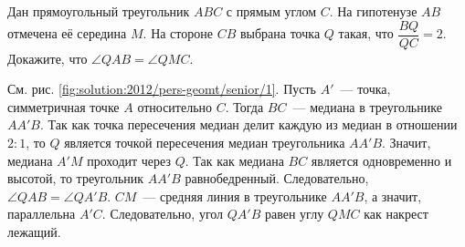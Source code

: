 Дан прямоугольный треугольник $ABC$ с прямым углом $C$.
На гипотенузе $AB$ отмечена её середина $M$.
На стороне $CB$ выбрана точка $Q$ такая, что $\dfrac{BQ}{QC} = 2$.
Докажите, что $\angle QAB = \angle QMC$.

%
\label{solution:2012/pers-geomt/senior/1}%
См. рис. \ref{fig:solution:2012/pers-geomt/senior/1}.
Пусть $A'$~--- точка, симметричная точке $A$ относительно $C$.
Тогда $BC$~--- медиана в треугольнике $AA'B$.
Так как точка пересечения медиан делит каждую из медиан в отношении $2 : 1$,
то $Q$ является точкой пересечения медиан треугольника $AA'B$.
Значит, медиана $A'M$ проходит через $Q$.
Так как медиана $BC$ является одновременно и высотой, то треугольник $AA'B$
равнобедренный.
Следовательно, $\angle QAB = \angle QA'B$.
$CM$~--- средняя линия в треугольнике $AA'B$, а значит, параллельна $A'C$.
Следовательно, угол $QA'B$ равен углу $QMC$ как накрест лежащий.

